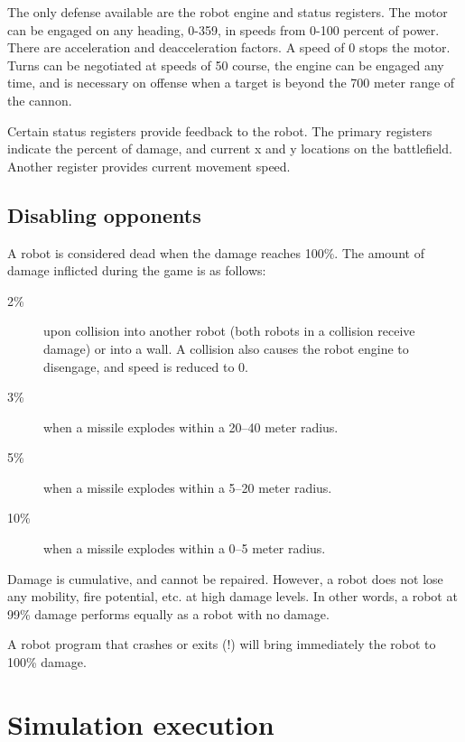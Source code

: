 \documentclass{article}
\begin{document}
        The only defense available are the robot engine and status
        registers.  The motor can be engaged on any heading, 0-359, in
        speeds from 0-100 percent of power.  There are acceleration and
        deacceleration factors.  A speed of 0 stops the motor.  Turns can
        be negotiated at speeds of 50%
        course, the engine can be engaged any time, and is necessary
        on offense when a target is beyond the 700 meter range of the
        cannon.

        Certain status registers provide feedback to the robot. The
        primary registers indicate the percent of damage, and current x
        and y locations on the battlefield.  Another register provides
        current movement speed.


\subsection{Disabling opponents}

        A robot is considered dead when the damage reaches 100\%.  The
        amount of damage inflicted during the game is as follows:

\begin{description}
\item[2\%] upon collision into another robot (both robots in a    
                     collision receive damage) or into a wall.  A
                     collision also causes the robot engine to disengage,
                     and speed is reduced to 0.

\item[3\%] when a missile explodes within a 20--40 meter radius.

\item[5\%] when a missile explodes within a 5--20 meter radius.

\item[10\%] when a missile explodes within a 0--5 meter radius.
\end{description}

        Damage is cumulative, and cannot be repaired.  However, a robot
        does not lose any mobility, fire potential, etc. at high damage
        levels.  In other words, a robot at 99\% damage performs equally
        as a robot with no damage.

        A robot program that crashes or exits (!) will bring immediately
        the robot to 100\% damage.

\section{Simulation execution}
\end{document}
